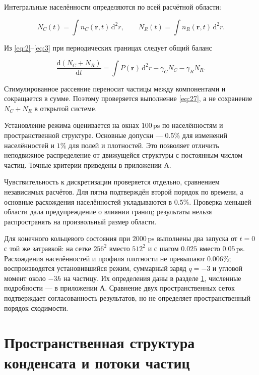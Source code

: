 \documentclass[12pt,a4paper]{article}
\begin{document}
Интегральные населённости определяются по всей расчётной области:

\begin{equation}\label{eq:26}
N_C(t)=\int n_C(\mathbf r,t)\,\mathrm d^2r,\qquad N_R(t)=\int n_R(\mathbf r,t)\,\mathrm d^2r.\end{equation}

Из \eqref{eq:2}--\eqref{eq:3} при периодических границах следует общий баланс

\begin{equation}\label{eq:27}
\frac{\mathrm d(N_C+N_R)}{\mathrm dt}=\int P(\mathbf r)\,\mathrm d^2r-\gamma_CN_C-\gamma_RN_R.\end{equation}

Стимулированное рассеяние переносит частицы между компонентами и сокращается в сумме. Поэтому проверяется выполнение \eqref{eq:27}, а не сохранение $N_{C}+N_{R}$ в открытой системе.

Установление режима оценивается на окнах $100\,\mathrm{ps}$ по населённостям и пространственной структуре. Основные допуски --- $0.5\%$ для изменений населённостей и $1\%$ для полей и плотностей. Это позволяет отличить неподвижное распределение от движущейся структуры с постоянным числом частиц. Точные критерии приведены в приложении А.

Чувствительность к дискретизации проверяется отдельно, сравнением независимых расчётов. Для пятна подтверждён второй порядок по времени, а основные расхождения населённостей укладываются в $0.5\%$. Проверка меньшей области дала предупреждение о влиянии границ; результаты нельзя распространять на произвольный размер области.

Для конечного кольцевого состояния при $2000\,\mathrm{ps}$ выполнены два запуска от $t=0$ с той же затравкой: на сетке $256^{2}$ вместо $512^{2}$ и с шагом $0.025$ вместо $0.05\,\mathrm{ps}$. Расхождения населённостей и профиля плотности не превышают $0.006\%$; воспроизводятся установившийся режим, суммарный заряд \mbox{$q=-3$} и угловой момент около $-3 \hbar$ на частицу. Их определения даны в разделе \ref{sec:6}, численные подробности --- в приложении А. Сравнение двух пространственных сеток подтверждает согласованность результатов, но не определяет пространственный порядок сходимости.

\clearpage

\section{Пространственная структура конденсата и потоки частиц}\label{sec:6}
\end{document}

